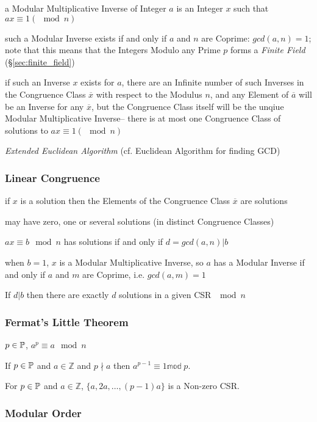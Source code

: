 a Modular Multiplicative Inverse of Integer $a$ is an Integer $x$ such that
$ax \equiv 1 (\mod n)$

such a Modular Inverse exists if and only if $a$ and $n$ are Coprime:
$gcd(a,n)=1$; note that this means that the Integers Modulo any Prime $p$ forms
a \emph{Finite Field} (\S\ref{sec:finite_field})

if such an Inverse $x$ exists for $a$, there are an Infinite number of such
Inverses in the Congruence Class $\overline{x}$ with respect to the Modulus $n$,
and any Element of $\overline{a}$ will be an Inverse for any $\overline{x}$, but
the Congruence Class itself will be the unqiue Modular Multiplicative Inverse--
there is at most one Congruence Class of solutions to $ax \equiv 1 (\mod n)$

\emph{Extended Euclidean Algorithm} (cf. Euclidean Algorithm for finding GCD)



\subsubsection{Linear Congruence}\label{sec:linear_congruence}

if $x$ is a solution then the Elements of the Congruence Class $\overline{x}$
are solutions

may have zero, one or several solutions (in distinct Congruence Classes)

$ax \equiv b \mod n$ has solutions if and only if $d = gcd(a,n) | b$

when $b = 1$, $x$ is a Modular Multiplicative Inverse, so $a$ has a Modular
Inverse if and only if $a$ and $m$ are Coprime, i.e. $gcd(a,m) = 1$

If $d|b$ then there are exactly $d$ solutions in a given CSR $\mod n$



\subsubsection{Fermat's Little Theorem}\label{sec:fermat_little}

$p \in \mathbb{P}$, $a^p \equiv a \mod n$

If $p \in \mathbb{P}$ and $a \in \mathbb{Z}$ and $p \nmid a$ then
$a^{p-1} \equiv 1 \mathbb{mod}\;p$.

For $p \in \mathbb{P}$ and $a \in \mathbb{Z}$, $\{ a, 2a, \ldots, (p-1)a
\}$ is a Non-zero CSR.



\subsubsection{Modular Order}\label{sec:modular_order}

